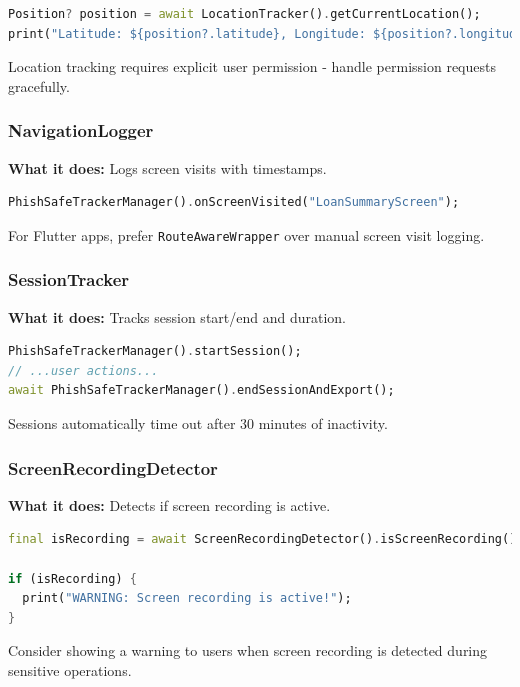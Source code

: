 \documentclass[11pt]{article}
\begin{document}
\begin{lstlisting}[language=Dart]
Position? position = await LocationTracker().getCurrentLocation();
print("Latitude: ${position?.latitude}, Longitude: ${position?.longitude}");
\end{lstlisting}

Location tracking requires explicit user permission - handle permission requests gracefully.

\subsubsection{NavigationLogger}
\textbf{What it does:} Logs screen visits with timestamps.

\begin{lstlisting}[language=Dart]
PhishSafeTrackerManager().onScreenVisited("LoanSummaryScreen");
\end{lstlisting}

For Flutter apps, prefer \texttt{RouteAwareWrapper} over manual screen visit logging.

\subsubsection{SessionTracker}
\textbf{What it does:} Tracks session start/end and duration.

\begin{lstlisting}[language=Dart]
PhishSafeTrackerManager().startSession();
// ...user actions...
await PhishSafeTrackerManager().endSessionAndExport();
\end{lstlisting}

Sessions automatically time out after 30 minutes of inactivity.

\subsubsection{ScreenRecordingDetector}
\textbf{What it does:} Detects if screen recording is active.

\begin{lstlisting}[language=Dart]
final isRecording = await ScreenRecordingDetector().isScreenRecording();

if (isRecording) {
  print("WARNING: Screen recording is active!");
}
\end{lstlisting}

Consider showing a warning to users when screen recording is detected during sensitive operations.
\end{document}
